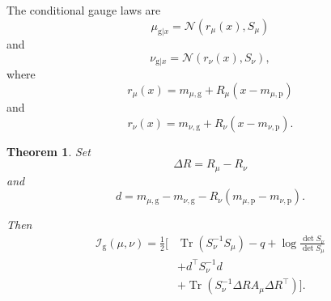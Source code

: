 \documentclass[11pt]{article}
\newtheorem{theorem}{Theorem}
\theoremstyle{remark}
\newcommand{\Tr}{\operatorname{Tr}}
\begin{document}
The conditional gauge laws are
\begin{equation}
\mu_{\mathrm g|x}
=
\mathcal N(r_\mu(x),S_\mu)
\label{eq:conditional-mu}
\end{equation}
and
\begin{equation}
\nu_{\mathrm g|x}
=
\mathcal N(r_\nu(x),S_\nu),
\label{eq:conditional-nu}
\end{equation}
where
\begin{equation}
r_\mu(x)
=
m_{\mu,\mathrm g}
+
R_\mu(x-m_{\mu,\mathrm p})
\label{eq:rmu}
\end{equation}
and
\begin{equation}
r_\nu(x)
=
m_{\nu,\mathrm g}
+
R_\nu(x-m_{\nu,\mathrm p}).
\label{eq:rnu}
\end{equation}

\begin{theorem}
\label{thm:explicit}
Set
\begin{equation}
\Delta R
=
R_\mu-R_\nu
\label{eq:delta-R}
\end{equation}
and
\begin{equation}
d
=
m_{\mu,\mathrm g}
-
m_{\nu,\mathrm g}
-
R_\nu
\left(
m_{\mu,\mathrm p}
-
m_{\nu,\mathrm p}
\right).
\label{eq:d}
\end{equation}

Then
\begin{align}
\mathcal I_{\mathrm g}(\mu,\nu)
=
\frac12
\Bigg[
&
\Tr(S_\nu^{-1}S_\mu)
-
q
+
\log
\frac{
\det S_\nu
}{
\det S_\mu
}
\nonumber\\
&+
d^\top S_\nu^{-1}d
\nonumber\\
&+
\Tr\left(
S_\nu^{-1}
\Delta R
A_\mu
\Delta R^\top
\right)
\Bigg].
\label{eq:explicit-gauge-info}
\end{align}
\end{theorem}
\end{document}
